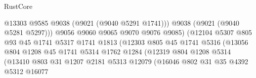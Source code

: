 \begin{lexlean}{RustCore}
\begin{coremodule}
                                            @13303
                                            @9585
                                            @9038
                                            (@9021 (@9040 @5291 @1741)))
                                          @9038
                                          (@9021 (@9040 @5281 @5297)))
                                        @9056
                                        @9060
                                        @9065
                                        @9070
                                        @9076
                                        @9085)
                                      (@12104
                                        @5307
                                        @805
                                        @93
                                        @45
                                        @1741
                                        @5317
                                        @1741
                                        @1813
                                        (@12303
                                          @805
                                          @45
                                          @1741
                                          @5316
                                          (@13056
                                            @804
                                            @1208
                                            @45
                                            @1741
                                            @5314
                                            @1762
                                            @1284
                                            (@12319
                                              @804
                                              @1208
                                              @5314
                                              (@13410
                                                @803
                                                @31
                                                @1207
                                                @2181
                                                @5313
                                                @12079
                                                (@16046
                                                  @802
                                                  @31
                                                  @35
                                                  @4392
                                                  @5312
                                                  @16077

\end{coremodule}
\end{lexlean}
